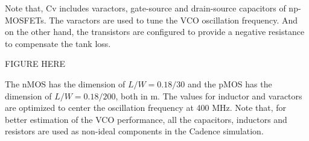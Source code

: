 
Note that, Cv includes varactors, gate-source and drain-source capacitors of np-MOSFETs. The varactors are used to tune the VCO oscillation frequency. And on the other hand, the transistors are configured to provide a negative resistance to compensate the tank loss. 

FIGURE HERE

The nMOS has the dimension of $L/W=0.18/30$ and the pMOS has the dimension of $L/W=0.18/200$, both in m. The values for inductor and varactors are optimized to center the oscillation frequency at 400 MHz. Note that, for better estimation of the VCO performance, all the capacitors, inductors and resistors are used as non-ideal components in the Cadence simulation. 

